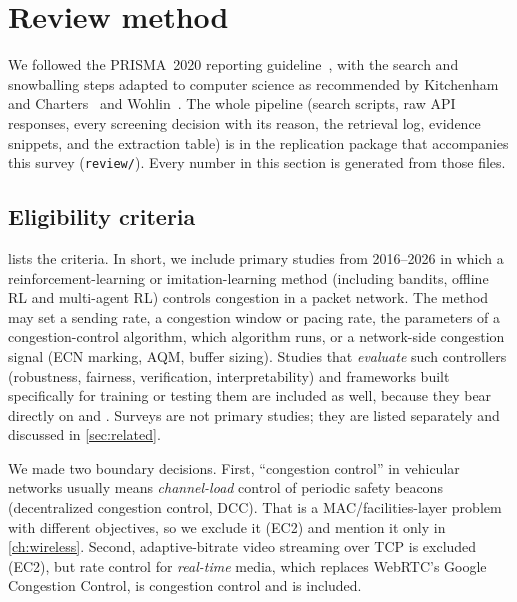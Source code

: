 \section{Review method}
\label{sec:method}

We followed the PRISMA~2020 reporting guideline~\cite{page2021prisma}, with the search and snowballing steps adapted to computer science as recommended by Kitchenham and Charters~\cite{kitchenham2007guidelines} and Wohlin~\cite{wohlin2014snowballing}. The whole pipeline (search scripts, raw API responses, every screening decision with its reason, the retrieval log, evidence snippets, and the extraction table) is in the replication package that accompanies this survey (\texttt{review/}). Every number in this section is generated from those files.

\subsection{Eligibility criteria}
\label{sec:eligibility}

 lists the criteria. In short, we include primary studies from 2016--2026 in which a reinforcement-learning or imitation-learning method (including bandits, offline RL and multi-agent RL) controls congestion in a packet network. The method may set a sending rate, a congestion window or pacing rate, the parameters of a congestion-control algorithm, which algorithm runs, or a network-side congestion signal (ECN marking, AQM, buffer sizing). Studies that \emph{evaluate} such controllers (robustness, fairness, verification, interpretability) and frameworks built specifically for training or testing them are included as well, because they bear directly on  and . Surveys are not primary studies; they are listed separately and discussed in \cref{sec:related}.

We made two boundary decisions. First, ``congestion control'' in vehicular networks usually means \emph{channel-load} control of periodic safety beacons (decentralized congestion control, DCC). That is a MAC/facilities-layer problem with different objectives, so we exclude it (EC2) and mention it only in \cref{ch:wireless}. Second, adaptive-bitrate video streaming over TCP is excluded (EC2), but rate control for \emph{real-time} media, which replaces WebRTC's Google Congestion Control, is congestion control and is included.

